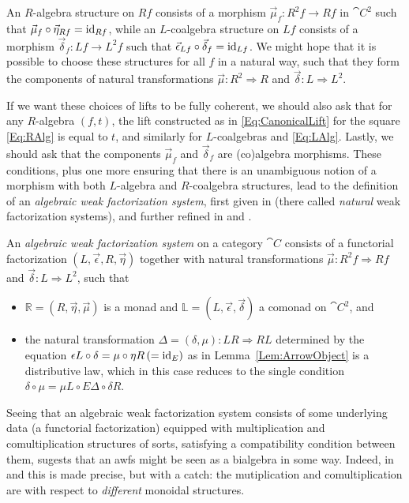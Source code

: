 An $R$-algebra structure on $Rf$ consists of a morphism $\vec{\mu}_f\colon R^2f\to Rf$ in $\cat{C}^2$ such that $\vec{\mu}_f\circ\vec{\eta}_{Rf}=\operatorname{id}_{Rf}$, while an $L$-coalgebra structure on $Lf$ consists of a morphism $\vec{\delta}_f\colon Lf\to L^2f$ such that $\vec{\epsilon}_{Lf}\circ\vec{\delta}_f=\operatorname{id}_{Lf}$. We might hope that it is possible to choose these structures for all $f$ in a natural way, such that they form the components of natural transformations $\vec{\mu}\colon R^2\Rightarrow R$ and $\vec{\delta}\colon L\Rightarrow L^2$.

If we want these choices of lifts to be fully coherent, we should also ask that for any $R$-algebra $(f,t)$, the lift constructed as in \eqref{Eq:CanonicalLift} for the square \eqref{Eq:RAlg} is equal to $t$, and similarly for $L$-coalgebras and \eqref{Eq:LAlg}. Lastly, we should ask that the components $\vec{\mu}_f$ and $\vec{\delta}_f$ are (co)algebra morphisms. These conditions, plus one more ensuring that there is an unambiguous notion of a morphism with both $L$-algebra and $R$-coalgebra structures, lead to the definition of an \emph{algebraic weak factorization system}, first given in \cite{gt:nwfs} (there called \emph{natural} weak factorization systems), and further refined in \cite{garner:nwfs} and \cite{garner:soa}.

\begin{definition}\label{Def:Awfs}
	An \emph{algebraic weak factorization system} on a category $\cat{C}$ consists of a functorial factorization $(L,\vec{\epsilon},R,\vec{\eta})$ together with natural transformations $\vec{\mu}\colon R^2f\Rightarrow Rf$ and $\vec{\delta}\colon L\Rightarrow L^2$, such that
	\begin{itemize}
		\item $\mathbb{R}=(R,\vec{\eta},\vec{\mu})$ is a monad and $\mathbb{L}=(L,\vec{\epsilon},\vec{\delta})$ a comonad on $\cat{C}^2$, and
		\item the natural transformation $\Delta=(\delta,\mu)\colon LR\Rightarrow RL$ determined by the equation $\epsilon L\circ\delta=\mu\circ\eta R \, (=\operatorname{id}_E)$ as in Lemma~\ref{Lem:ArrowObject} is a distributive law, which in this case reduces to the single condition $\delta\circ\mu = \mu L\circ E\Delta\circ\delta R$.
	\end{itemize}
\end{definition}

Seeing that an algebraic weak factorization system consists of some underlying data (a functorial factorization) equipped with multiplication and comultiplication structures of sorts, satisfying a compatibility condition between them, sugests that an awfs might be seen as a bialgebra in some way. Indeed, in \cite{garner:nwfs} and \cite{garner:soa} this is made precise, but with a catch: the mutiplication and comultiplication are with respect to \emph{different} monoidal structures.

